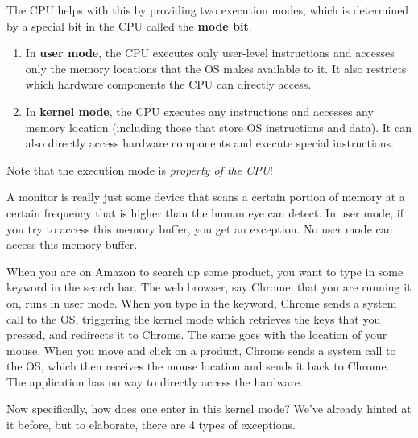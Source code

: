 \documentclass{article}
\begin{document}
    \begin{definition}
      The CPU helps with this by providing two execution modes, which is determined by a special bit in the CPU called the \textbf{mode bit}. 
      \begin{enumerate}
        \item In \textbf{user mode}, the CPU executes only user-level instructions and accesses only the memory locations that the OS makes available to it. It also restricts which hardware components the CPU can directly access. 
        \item In \textbf{kernel mode}, the CPU executes any instructions and accesses any memory location (including those that store OS instructions and data). It can also directly access hardware components and execute special instructions. 
      \end{enumerate}
      Note that the execution mode is \textit{property of the CPU}!  
    \end{definition}

    \begin{example}[Monitor]
      A monitor is really just some device that scans a certain portion of memory at a certain frequency that is higher than the human eye can detect. In user mode, if you try to access this memory buffer, you get an exception. No user mode can access this memory buffer. 
    \end{example}

    \begin{example}
      When you are on Amazon to search up some product, you want to type in some keyword in the search bar. The web browser, say Chrome, that you are running it on, runs in user mode. When you type in the keyword, Chrome sends a system call to the OS, triggering the kernel mode which retrieves the keys that you pressed, and redirects it to Chrome. The same goes with the location of your mouse. When you move and click on a product, Chrome sends a system call to the OS, which then receives the mouse location and sends it back to Chrome. The application has no way to directly access the hardware. 
    \end{example}

    Now specifically, how does one enter in this kernel mode? We've already hinted at it before, but to elaborate, there are 4 types of exceptions. 
\end{document}
